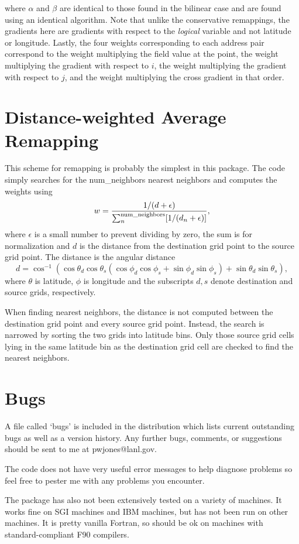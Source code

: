 \documentclass[12pt]{report}
\begin{document}
where $\alpha$ and $\beta$ are identical to those found in
the bilinear case and are found using an identical algorithm.
Note that unlike the conservative remappings, the gradients
here are gradients with respect to the {\em logical} variable
and not latitude or longitude.  Lastly, the four weights
corresponding to each address pair correspond to the
weight multiplying the field value at the point, the weight
multiplying the gradient with respect to $i$, the weight
multiplying the gradient with respect to $j$, and the weight
multiplying the cross gradient in that order.

\chapter{Distance-weighted Average Remapping}

This scheme for remapping is probably the simplest
in this package.  The code simply searches for the
num\_neighbors nearest neighbors and computes the
weights using
\begin{equation}\label{eq:distwgt}
w = {{1/(d+\epsilon)} \over
     {\sum_n^{\rm num\_neighbors} [1/(d_n+\epsilon)]}},
\end{equation}
where $\epsilon$ is a small number to prevent
dividing by zero, the sum is for normalization and
$d$ is the distance from the destination grid point
to the source grid point.  The distance is the angular
distance
\begin{equation}\label{eq:distance}
d = \cos^{-1}\left(\cos\theta_d\cos\theta_s
                  (\cos\phi_d\cos\phi_s + \sin\phi_d\sin\phi_s) +
                   \sin\theta_d\sin\theta_s\right),
\end{equation}
where $\theta$ is latitude, $\phi$ is longitude and the
subscripts $d,s$ denote destination and source grids,
respectively.

When finding nearest neighbors, the distance is not
computed between the destination grid point and every
source grid point.  Instead, the search is narrowed by
sorting the two grids into latitude bins.  Only those
source grid cells lying in the same latitude bin as
the destination grid cell are checked to find the
nearest neighbors.

\chapter{Bugs}

A file called `bugs' is included in the distribution
which lists current outstanding bugs as well as a
version history.  Any further bugs, comments, or suggestions
should be sent to me at pwjones@lanl.gov.

The code does not have very useful error messages to
help diagnose problems so feel free to pester me with
any problems you encounter.

The package has also not been extensively tested on
a variety of machines.  It works fine on SGI machines
and IBM machines, but has not been run on other machines.
It is pretty vanilla Fortran, so should be ok on
machines with standard-compliant F90 compilers.
\end{document}

